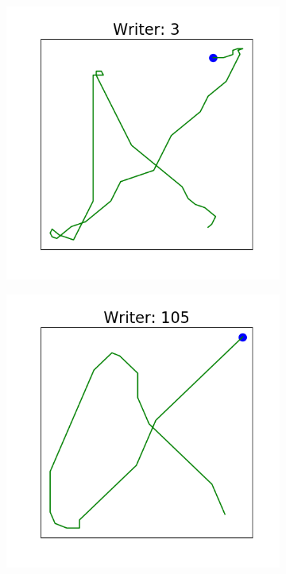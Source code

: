   \begin{figure}[!htbp]
      \centering
      \begin{subfigure}{0.45\textwidth}
          \includegraphics[scale=0.50]{images/framework/X_3.png}
      \end{subfigure}
      \hspace{0.5em}
      \begin{subfigure}{0.45\textwidth}
          \includegraphics[scale=0.50]{images/framework/X_105.png}

\end{subfigure}
\end{figure}

